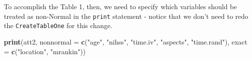 \documentclass[]{book}
\newenvironment{Shaded}{\begin{snugshade}}{\end{snugshade}}
\newcommand{\KeywordTok}[1]{\textcolor[rgb]{0.13,0.29,0.53}{\textbf{#1}}}
\newcommand{\DataTypeTok}[1]{\textcolor[rgb]{0.13,0.29,0.53}{#1}}
\newcommand{\StringTok}[1]{\textcolor[rgb]{0.31,0.60,0.02}{#1}}
\newcommand{\NormalTok}[1]{#1}
\theoremstyle{definition}
\theoremstyle{definition}
\theoremstyle{definition}
\theoremstyle{remark}
\begin{document}
To accomplish the Table 1, then, we need to specify which variables
should be treated as non-Normal in the \texttt{print} statement - notice
that we don't need to redo the \texttt{CreateTableOne} for this change.

\begin{Shaded}
\begin{Highlighting}[]
\KeywordTok{print}\NormalTok{(att2, }
      \DataTypeTok{nonnormal =} \KeywordTok{c}\NormalTok{(}\StringTok{"age"}\NormalTok{, }\StringTok{"nihss"}\NormalTok{, }\StringTok{"time.iv"}\NormalTok{, }\StringTok{"aspects"}\NormalTok{, }\StringTok{"time.rand"}\NormalTok{),}
      \DataTypeTok{exact =} \KeywordTok{c}\NormalTok{(}\StringTok{"location"}\NormalTok{, }\StringTok{"mrankin"}\NormalTok{))}
\end{Highlighting}
\end{Shaded}
\end{document}
